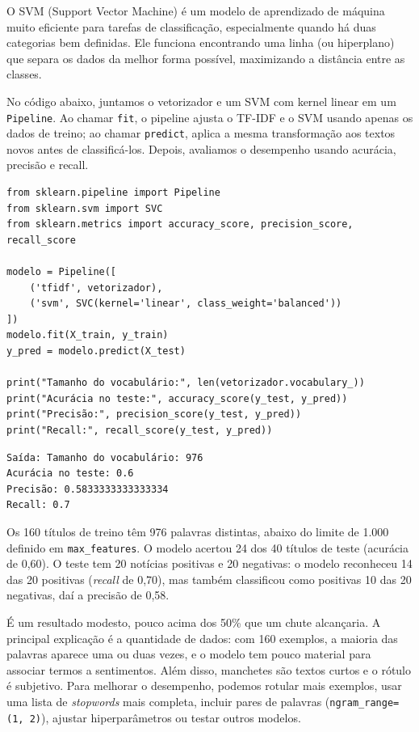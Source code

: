 \documentclass[a4paper,12pt,openany]{book}
\begin{document}
O SVM (Support Vector Machine) é um modelo de aprendizado de máquina muito eficiente para tarefas de classificação, especialmente quando há duas categorias bem definidas. Ele funciona encontrando uma linha (ou hiperplano) que separa os dados da melhor forma possível, maximizando a distância entre as classes.

No código abaixo, juntamos o vetorizador e um SVM com kernel linear em um \texttt{Pipeline}. Ao chamar \texttt{fit}, o pipeline ajusta o TF-IDF e o SVM usando apenas os dados de treino; ao chamar \texttt{predict}, aplica a mesma transformação aos textos novos antes de classificá-los. Depois, avaliamos o desempenho usando acurácia, precisão e recall.

\begin{verbatim}
from sklearn.pipeline import Pipeline
from sklearn.svm import SVC
from sklearn.metrics import accuracy_score, precision_score, recall_score

modelo = Pipeline([
    ('tfidf', vetorizador),
    ('svm', SVC(kernel='linear', class_weight='balanced'))
])
modelo.fit(X_train, y_train)
y_pred = modelo.predict(X_test)

print("Tamanho do vocabulário:", len(vetorizador.vocabulary_))
print("Acurácia no teste:", accuracy_score(y_test, y_pred))
print("Precisão:", precision_score(y_test, y_pred))
print("Recall:", recall_score(y_test, y_pred))
\end{verbatim}

\begin{verbatim}
Saída: Tamanho do vocabulário: 976
Acurácia no teste: 0.6
Precisão: 0.5833333333333334
Recall: 0.7
\end{verbatim}

Os 160 títulos de treino têm 976 palavras distintas, abaixo do limite de 1.000 definido em \texttt{max\_features}. O modelo acertou 24 dos 40 títulos de teste (acurácia de 0,60). O teste tem 20 notícias positivas e 20 negativas: o modelo reconheceu 14 das 20 positivas (\textit{recall} de 0,70), mas também classificou como positivas 10 das 20 negativas, daí a precisão de 0,58.

É um resultado modesto, pouco acima dos 50\% que um chute alcançaria. A principal explicação é a quantidade de dados: com 160 exemplos, a maioria das palavras aparece uma ou duas vezes, e o modelo tem pouco material para associar termos a sentimentos. Além disso, manchetes são textos curtos e o rótulo é subjetivo. Para melhorar o desempenho, podemos rotular mais exemplos, usar uma lista de \textit{stopwords} mais completa, incluir pares de palavras (\texttt{ngram\_range=(1, 2)}), ajustar hiperparâmetros ou testar outros modelos.
\end{document}
